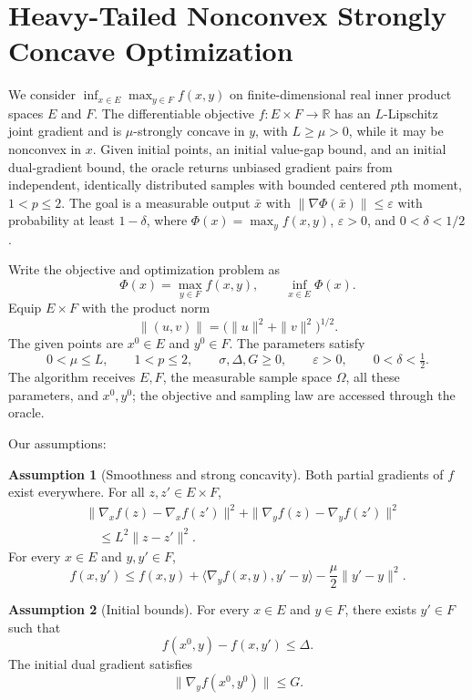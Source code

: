 \documentclass[10pt]{article}
\theoremstyle{definition}
\newtheorem{assumption}{Assumption}
\begin{document}
\section*{Heavy-Tailed Nonconvex Strongly Concave Optimization}
We consider $\inf_{x\in E}\max_{y\in F}f(x,y)$ on finite-dimensional real inner product spaces $E$ and $F$. The differentiable objective $f:E\times F\to\mathbb{R}$ has an $L$-Lipschitz joint gradient and is $\mu$-strongly concave in $y$, with $L\geq\mu>0$, while it may be nonconvex in $x$. Given initial points, an initial value-gap bound, and an initial dual-gradient bound, the oracle returns unbiased gradient pairs from independent, identically distributed samples with bounded centered $p$th moment, $1<p\leq2$. The goal is a measurable output $\bar{x}$ with $\|\nabla\Phi(\bar{x})\|\leq\varepsilon$ with probability at least $1-\delta$, where $\Phi(x)=\max_y f(x,y)$, $\varepsilon>0$, and $0<\delta<1/2$.

Write the objective and optimization problem as
\[
\Phi(x)=\max_{y\in F}f(x,y),
\qquad \inf_{x\in E}\Phi(x).
\]
Equip $E\times F$ with the product norm
\[
\|(u,v)\|=\bigl(\|u\|^2+\|v\|^2\bigr)^{1/2}.
\]
The given points are $x^0\in E$ and $y^0\in F$. The parameters satisfy
\[
0<\mu\leq L,\qquad 1<p\leq2,\qquad
\sigma,\Delta,G\geq0,\qquad
\varepsilon>0,\qquad 0<\delta<\tfrac12.
\]
The algorithm receives $E,F$, the measurable sample space $\Omega$, all these parameters, and $x^0,y^0$; the objective and sampling law are accessed through the oracle.

Our assumptions:
\begin{assumption}[Smoothness and strong concavity]
Both partial gradients of $f$ exist everywhere. For all $z,z'\in E\times F$,
\[
\begin{aligned}
&\|\nabla_x f(z)-\nabla_x f(z')\|^2
 +\|\nabla_y f(z)-\nabla_y f(z')\|^2\\
&\hspace{1em}\leq L^2\|z-z'\|^2.
\end{aligned}
\]
For every $x\in E$ and $y,y'\in F$,
\[
f(x,y')\leq f(x,y)
+\langle\nabla_y f(x,y),y'-y\rangle
-\frac{\mu}{2}\|y'-y\|^2.
\]
\end{assumption}

\begin{assumption}[Initial bounds]
For every $x\in E$ and $y\in F$, there exists $y'\in F$ such that
\[
f(x^0,y)-f(x,y')\leq\Delta.
\]
The initial dual gradient satisfies
\[
\|\nabla_y f(x^0,y^0)\|\leq G.
\]
\end{assumption}
\end{document}
